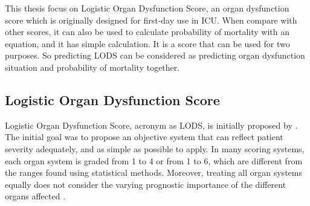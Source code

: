 \documentclass[12pt,a4paper,english
]{tunithesis}
\begin{document}
This thesis focus on Logistic Organ Dysfunction Score, an organ dysfunction score which is originally designed for first-day use in ICU. When compare with other scores, it can also be used to calculate probability of mortality with an equation, and it has simple calculation. It is a score that can be used for two purposes. So predicting LODS can be considered as predicting organ dysfunction situation and probability of mortality together. 

\subsection{Logistic Organ Dysfunction Score}
Logistic Organ Dysfunction Score, acronym as LODS, is initially proposed by \textcite{legall96}. The initial goal was to propose an objective system that can reflect  patient severity adequately, and as simple as possible to apply.  In many scoring systems, each organ system is graded from 1 to 4 or from 1 to 6, which are different from the ranges found using statistical methods. Moreover, treating all organ systems equally does not consider the varying prognostic importance of the different organs affected \parencite{Tiffany21}.
\end{document}
